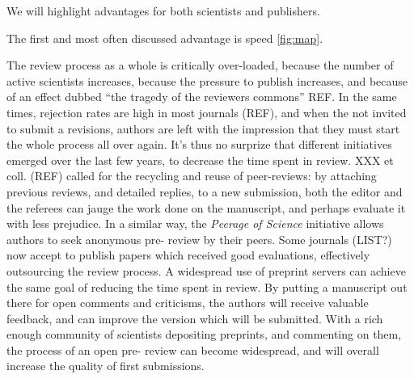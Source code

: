\documentclass[letterpaper,twocolumn,superscriptaddress,showkeys]{revtex4}
\begin{document}
We will highlight advantages for both scientists and publishers.

The first and most often discussed advantage is speed \ref{fig:map}.



The review process as a whole is critically over-loaded, because the number of
active scientists increases, because the pressure to publish increases, and
because of an effect dubbed ``the tragedy of the reviewers commons'' REF.  In
the same times, rejection rates are high in most journals (REF), and when the
not invited to submit a revisions, authors are left with the impression that
they must start the whole process all over again. It's thus no surprize that
different initiatives emerged over the last few years, to decrease the time
spent in review. XXX et coll. (REF) called for the recycling and reuse of
peer-reviews: by attaching previous reviews, and detailed replies, to a new
submission, both the editor and the referees can jauge the work done on the
manuscript, and perhaps evaluate it with less prejudice. In a similar way, the
\emph{Peerage of Science} initiative allows authors to seek anonymous pre-
review by their peers. Some journals (LIST?) now accept to publish papers
which received good evaluations, effectively outsourcing the review process. A
widespread use of preprint servers can achieve the same goal of reducing the
time spent in review. By putting a manuscript out there for open comments and
criticisms, the authors will receive valuable feedback, and can improve the
version which will be submitted. With a rich enough community of scientists
depositing preprints, and commenting on them, the process of an open pre-
review can become widespread, and will overall increase the quality of first
submissions.
\end{document}
